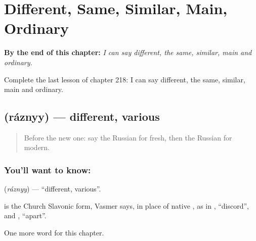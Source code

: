 
\chapter{Different, Same, Similar, Main, Ordinary}
\label{ch:ru-different-same-similar-main-ordinary}

\begin{chapteropening}
\textbf{By the end of this chapter:} \emph{I can say different, the same, similar, main and ordinary.}

Complete the last lesson of chapter 218: I can say different, the same, similar, main and ordinary.
\end{chapteropening}

\section[\texorpdfstring{\ru{разный} (ráznyy)}{разный (ráznyy)}]{ (ráznyy) — different, various}

\label{lesson:RU-C218-raznyy}



\begin{quote}
Before the new one: say the Russian for fresh, then the Russian for modern.
\end{quote}

\subsection*{You'll want to know: }
\textbf{} (\emph{ráznyy}) — \textquotedblleft{}different, various\textquotedblright{}.

\begin{cousinweb}
\textbf{} is the Church Slavonic form, Vasmer says, in place of native \emph{}, as in \emph{}, \textquotedblleft{}discord\textquotedblright{}, and \emph{}, \textquotedblleft{}apart\textquotedblright{}.
\end{cousinweb}

\begin{grammarlens}[title={What you've built}]
One more word for this chapter.
\end{grammarlens}

